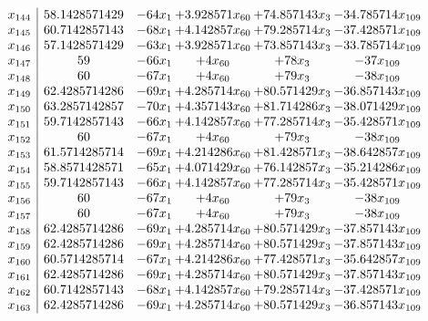 \documentclass[11pt]{article}
\begin{document}
\[\begin{array}{c| c c@{\hskip 2pt} c@{\hskip 2pt} c@{\hskip 2pt} c@{\hskip 2pt} }
 x_{144}   &  58.1428571429 & -64 x_{1} & + 3.928571 x_{60} & + 74.857143 x_{3} & -34.785714 x_{109}\\
 x_{145}   &  60.7142857143 & -68 x_{1} & + 4.142857 x_{60} & + 79.285714 x_{3} & -37.428571 x_{109}\\
 x_{146}   &  57.1428571429 & -63 x_{1} & + 3.928571 x_{60} & + 73.857143 x_{3} & -33.785714 x_{109}\\
 x_{147}   &  59 & -66 x_{1} & + 4 x_{60} & + 78 x_{3} & -37 x_{109}\\
 x_{148}   &  60 & -67 x_{1} & + 4 x_{60} & + 79 x_{3} & -38 x_{109}\\
 x_{149}   &  62.4285714286 & -69 x_{1} & + 4.285714 x_{60} & + 80.571429 x_{3} & -36.857143 x_{109}\\
 x_{150}   &  63.2857142857 & -70 x_{1} & + 4.357143 x_{60} & + 81.714286 x_{3} & -38.071429 x_{109}\\
 x_{151}   &  59.7142857143 & -66 x_{1} & + 4.142857 x_{60} & + 77.285714 x_{3} & -35.428571 x_{109}\\
 x_{152}   &  60 & -67 x_{1} & + 4 x_{60} & + 79 x_{3} & -38 x_{109}\\
 x_{153}   &  61.5714285714 & -69 x_{1} & + 4.214286 x_{60} & + 81.428571 x_{3} & -38.642857 x_{109}\\
 x_{154}   &  58.8571428571 & -65 x_{1} & + 4.071429 x_{60} & + 76.142857 x_{3} & -35.214286 x_{109}\\
 x_{155}   &  59.7142857143 & -66 x_{1} & + 4.142857 x_{60} & + 77.285714 x_{3} & -35.428571 x_{109}\\
 x_{156}   &  60 & -67 x_{1} & + 4 x_{60} & + 79 x_{3} & -38 x_{109}\\
 x_{157}   &  60 & -67 x_{1} & + 4 x_{60} & + 79 x_{3} & -38 x_{109}\\
 x_{158}   &  62.4285714286 & -69 x_{1} & + 4.285714 x_{60} & + 80.571429 x_{3} & -37.857143 x_{109}\\
 x_{159}   &  62.4285714286 & -69 x_{1} & + 4.285714 x_{60} & + 80.571429 x_{3} & -37.857143 x_{109}\\
 x_{160}   &  60.5714285714 & -67 x_{1} & + 4.214286 x_{60} & + 77.428571 x_{3} & -35.642857 x_{109}\\
 x_{161}   &  62.4285714286 & -69 x_{1} & + 4.285714 x_{60} & + 80.571429 x_{3} & -37.857143 x_{109}\\
 x_{162}   &  60.7142857143 & -68 x_{1} & + 4.142857 x_{60} & + 79.285714 x_{3} & -37.428571 x_{109}\\
 x_{163}   &  62.4285714286 & -69 x_{1} & + 4.285714 x_{60} & + 80.571429 x_{3} & -36.857143 x_{109}\\

\end{array}\]
\end{document}

